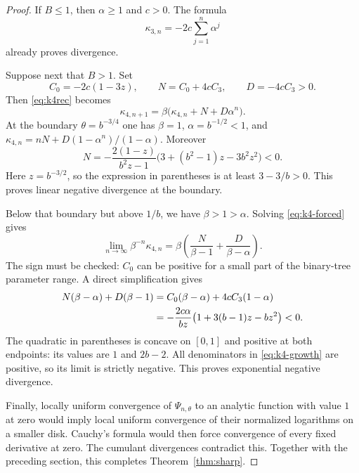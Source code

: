 \documentclass[11pt]{article}
\theoremstyle{definition}
\begin{document}
\begin{proof}
If $B\leq1$, then $\alpha\geq1$ and $c>0$. The formula
\[
             \kappa_{3,n}=-2c\sum_{j=1}^n\alpha^j
\]
already proves divergence.

Suppose next that $B>1$. Set
\[
 C_0=-2c(1-3z),\qquad
 N=C_0+4cC_3,\qquad D=-4cC_3>0.
\]
Then \eqref{eq:k4rec} becomes
\begin{equation}\label{eq:k4-forced}
 \kappa_{4,n+1}=\beta\bigl(\kappa_{4,n}+N+D\alpha^n\bigr).
\end{equation}
At the boundary $\theta=b^{-3/4}$ one has $\beta=1$,
$\alpha=b^{-1/2}<1$, and
$\kappa_{4,n}=nN+D(1-\alpha^n)/(1-\alpha)$. Moreover
\begin{equation}\label{eq:Nsign}
 N=-\frac{2(1-z)}{b^2z-1}
        \bigl(3+(b^2-1)z-3b^2z^2\bigr)<0.
\end{equation}
Here $z=b^{-3/2}$, so the expression in parentheses is at least
$3-3/b>0$. This proves linear negative divergence at the boundary.

Below that boundary but above $1/b$, we have $\beta>1>\alpha$.
Solving \eqref{eq:k4-forced} gives
\begin{equation}\label{eq:k4-growth}
 \lim_{n\to\infty}\beta^{-n}\kappa_{4,n}
       =\beta\left(\frac{N}{\beta-1}
                          +\frac{D}{\beta-\alpha}\right).
\end{equation}
The sign must be checked: $C_0$ can be positive for a small part of
the binary-tree parameter range. A direct simplification gives
\begin{align}
 N(\beta-\alpha)+D(\beta-1)
 &=C_0(\beta-\alpha)+4cC_3(1-\alpha)\notag\\
 &=-\frac{2c\alpha}{bz}
           \bigl(1+3(b-1)z-bz^2\bigr)<0.\label{eq:negative-amplitude}
\end{align}
The quadratic in parentheses is concave on $[0,1]$ and positive at
both endpoints: its values are $1$ and $2b-2$. All denominators in
\eqref{eq:k4-growth} are positive, so its limit is strictly negative.
This proves exponential negative divergence.

Finally, locally uniform convergence of $\Psi_{n,\theta}$ to an
analytic function with value $1$ at zero would imply local uniform
convergence of their normalized logarithms on a smaller disk. Cauchy's
formula would then force convergence of every fixed derivative at zero.
The cumulant divergences contradict this. Together with the preceding
section, this completes Theorem~\ref{thm:sharp}.
\end{proof}
\end{document}
